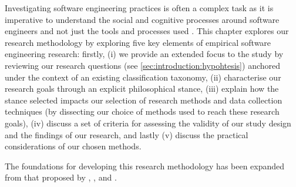 \label{sec:research-methodology:preface}

Investigating software engineering practices is often a complex task as it is imperative to understand the social and cognitive processes around software engineers and not just the tools and processes used \citep{Easterbrook:2007ws}. This chapter explores our research methodology by exploring five key elements of empirical software engineering research: firstly, (i) we provide an extended focus to the study by reviewing our research questions (see \cref{sec:introduction:hypohtesis}) anchored under the context of an existing classification taxonomy, (ii) characterise our research goals through an explicit philosophical stance, (iii) explain how the stance selected impacts our selection of research methods and data collection techniques (by dissecting our choice of methods used to reach these research goals), (iv) discuss a set of criteria for assessing the validity of our study design and the findings of our research, and lastly (v) discuss the practical considerations of our chosen methods. 

The foundations for developing this research methodology has been expanded from that proposed by \citet{Easterbrook:2007ws}, \citet{Wohlin:2014jq}, \citet{Wohlin:2012bu} and \citet{Shaw:2003aa}.